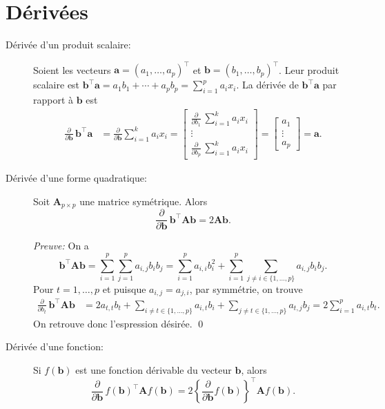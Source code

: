 \section{Dérivées}


\begin{description}
\item[Dérivée d'un produit scalaire:] Soient les vecteurs $\mathbf{a} = (a_1, \ldots, a_p)^\top$ et $\mathbf{b} = (b_1, \ldots, b_p)^\top$. Leur produit scalaire est $\mathbf{b^\top a} = a_1 b_1 + \cdots + a_p b_p = \sum_{i=1}^p a_i x_i$. La dérivée de $\mathbf{b^\top a}$ par rapport à $\mathbf{b}$ est
 \begin{align*}
    \frac{\partial}{\partial \mathbf{b}}\, \mathbf{b^\top a}
    &= \frac{\partial}{\partial \mathbf{b}}\sum_{i=1}^k a_i x_i 
    =
    \begin{bmatrix}
      \frac{\partial}{\partial b_1}\, \sum_{i=1}^k a_i x_i \\
      \vdots \\
      \frac{\partial}{\partial b_p}\, \sum_{i=1}^k a_i x_i
    \end{bmatrix} 
    =
    \begin{bmatrix}
      a_1 \\
      \vdots \\
      a_p
    \end{bmatrix} 
    = \mathbf{a}.
  \end{align*}

\item [Dérivée d'une forme quadratique:]  Soit $\mathbf{A}_{p \times p}$ une matrice symétrique. Alors
$$ 
 \frac{\partial}{\partial \mathbf{b}}\, \mathbf{b^\top A b} = 2 \mathbf{A b}.
$$

\emph{Preuve:}  On a
$$
\mathbf{b^\top A b}  = \sum_{i=1}^p \sum_{j=1}^p a_{i,j} b_i b_j 
    = \sum_{i=1}^p a_{i,i} b_i^2 +
       \sum_{i=1}^p \sum_{j \ne i \in \{1,\ldots, p\}} a_{i,j} b_i b_j.
$$
Pour $t = 1, \dots, p$ et puisque $a_{i,j} = a_{j,i}$, par symmétrie, on trouve
  \begin{align*}
    \frac{\partial}{\partial b_t}\, \mathbf{b^\top A b}
    &= 2 a_{t,t} b_t + \sum_{i \ne t \in \{1,\ldots, p\}} a_{i,t} b_i +
       \sum_{j \ne t \in \{1,\ldots, p\}} a_{t,j} b_j = 2 \sum_{i=1}^p a_{i,t} b_t. 
  \end{align*}
On retrouve donc l'espression désirée. \hfill \qed

\item [Dérivée d'une fonction:]  Si $f(\mathbf{b})$ est une fonction dérivable du vecteur $\mathbf{b}$, alors
$$
 \frac{\partial}{\partial \mathbf{b}}\,f(\mathbf{b})^\top \mathbf{A} f(\mathbf{b}) =
   2 \left\{  \frac{\partial}{\partial \mathbf{b}} f(\mathbf{b}) \right\}^\top \mathbf{A} f(\mathbf{b}).
$$

\end{description}

